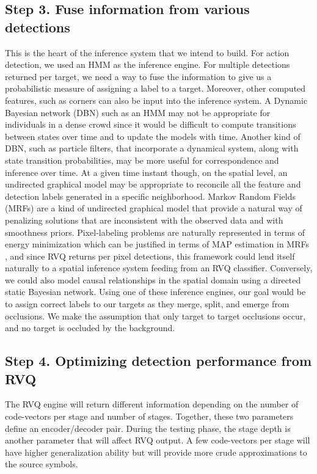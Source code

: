 \documentclass[12pt,letterpaper,doublespaced,ETD,proposal]{gt-ece-thesis}
\begin{document}
\begin{Body}
\subsection{Step 3. Fuse information from various detections}   
This is the heart of the inference system that we intend to build.  For action detection, we used an HMM \cite{2010_CNF_HMMRVQ_Aslam} as the inference engine.  For multiple detections returned per target, we need a way to fuse the information to give us a probabilistic measure of assigning a label to a target.  Moreover, other computed features, such as corners can also be input into the inference system.  A Dynamic Bayesian network (DBN) such as an HMM may not be appropriate for individuals in a dense crowd since it would be difficult to compute transitions between states over time and to update the models with time.  Another kind of DBN, such as particle filters, that incorporate a dynamical system, along with state transition probabilities, may be more useful for correspondence and inference over time.  At a given time instant though, on the spatial level, an undirected graphical model may be appropriate to reconcile all the feature and detection labels generated in a specific neighborhood.  Markov Random Fields (MRFs) are a kind of undirected graphical model that provide a natural way of penalizing solutions that are inconsistent with the observed data and with smoothness priors.  Pixel-labeling problems are naturally represented in terms of energy minimization which can be justified in terms of MAP estimation in MRFs \cite{1984_JNL_StochasticRelaxation_Geman, 2008_JNL_MRF_Szeliski}, and since RVQ returns per pixel detections, this framework could lend itself naturally to a spatial inference system feeding from an RVQ classifier.  Conversely, we could also model causal relationships in the spatial domain using a directed static Bayesian network.  Using one of these inference engines, our goal would be to assign correct labels to our targets as they merge, split, and emerge from occlusions.  We make the assumption that only target to target occlusions occur, and no target is occluded by the background.

\subsection{Step 4. Optimizing detection performance from RVQ} 
The RVQ engine will return different information depending on the number of code-vectors per stage and number of stages.  Together, these two parameters define an encoder/decoder pair.  During the testing phase, the stage depth is another parameter that will affect RVQ output.  A few code-vectors per stage will have higher generalization ability but will provide more crude approximations to the source symbols.  


\end{Body}
\end{document}
